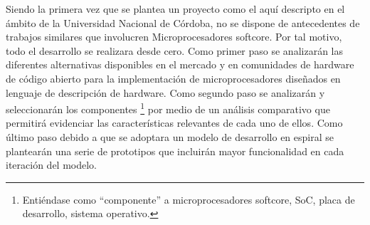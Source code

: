 Siendo la primera vez que se plantea un proyecto como el aquí
descripto en el ámbito de la Universidad Nacional de Córdoba, no se
dispone de antecedentes de trabajos similares que involucren
Microprocesadores softcore. Por tal motivo, todo el desarrollo se
realizara desde cero. Como primer paso se analizarán las diferentes
alternativas disponibles en el mercado y en comunidades de hardware de
código abierto para la implementación de microprocesadores diseñados
en lenguaje de descripción de hardware. Como segundo paso 
se analizarán y seleccionarán los componentes \footnote{Entiéndase como ``componente'' a 
microprocesadores softcore, SoC, placa de desarrollo, sistema operativo.} 
por medio de un análisis comparativo que permitirá evidenciar las características relevantes de
cada uno de ellos. Como último paso debido a que se adoptara un modelo de desarrollo en espiral se plantearán una serie de prototipos que incluirán mayor funcionalidad en cada iteración del modelo.



